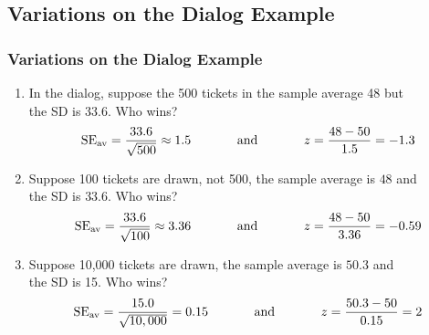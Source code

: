 \documentclass[t]{beamer}
\begin{document}
\subsection{Variations  on the Dialog Example}
\begin{frame}
\frametitle{Variations on the Dialog Example}

{\small\begin{enumerate}
\item In the dialog, suppose the 500 tickets in the sample average 48 but\\ the SD is 33.6.  
Who wins?\vspace{-5pt}
\[\mbox{SE}_{\mbox{\scriptsize av}} = \frac{33.6}{\sqrt{500}} \approx 1.5
\hspace{.5in} \mbox{and}\hspace{.5in}
  z = \frac{48-50}{1.5}= -1.3\vspace{-5pt}\]
\item  Suppose 100 tickets are drawn, not 500, the sample average is $48$ and\\ the SD is $33.6$.
Who wins?\vspace{-5pt}
\[\mbox{SE}_{\mbox{\scriptsize av}} = \frac{33.6}{\sqrt{100}} \approx 3.36
\hspace{.5in} \mbox{and}\hspace{.5in}
  z = \frac{48-50}{3.36}= -0.59\]
\item Suppose 10,000 tickets are drawn, the sample average is $50.3$ and \\ the SD is 15.  
Who wins?\vspace{-5pt}
\[\mbox{SE}_{\mbox{\scriptsize av}} = \frac{15.0}{\sqrt{10,000}} = 0.15
\hspace{.5in} \mbox{and}\hspace{.5in}
  z = \frac{50.3-50}{0.15}= 2\]
\end{enumerate}
}
\end{frame}
\end{document}

